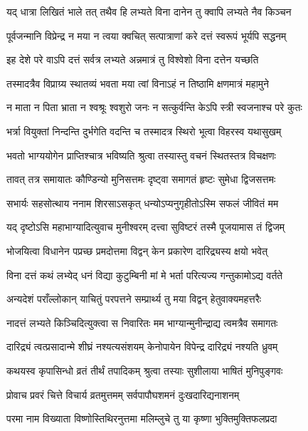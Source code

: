 \twolineshloka
{यद् धात्रा लिखितं भाले तत् तथैव हि लभ्यते}
{विना दानेन तु क्वापि लभ्यते नैव किञ्चन} %

\twolineshloka
{पूर्वजन्मानि विप्रेन्द्र न मया न त्वया क्वचित्}
{सत्पात्राणां करे दत्तं स्वरूपं भूर्यपि सद्धनम्} %

\twolineshloka
{इह देशे परे वाऽपि दत्तं सर्वत्र लभ्यते}
{अन्नमात्रं तु विश्वेशो विना दत्तेन यच्छति} %

\twolineshloka
{तस्मादत्रैव विप्राग्र्य स्थातव्यं भवता मया}
{त्वां विनाऽहं न तिष्ठामि क्षणमात्रं महामुने} %

\twolineshloka
{न माता न पिता भ्राता न श्वश्रूः श्वशुरो जनः}
{न सत्कुर्वन्ति केऽपि स्त्री स्वजनाश्च परे कुतः} %

\twolineshloka
{भर्त्रा वियुक्तां निन्दन्ति दुर्भगेति वदन्ति च}
{तस्मादत्र स्थिरो भूत्वा विहरस्व यथासुखम्} %

\twolineshloka
{भवतो भाग्ययोगेन प्राप्तिश्चात्र भविष्यति}
{श्रुत्वा तस्यास्तु वचनं स्थितस्तत्र विचक्षणः} %

\twolineshloka
{तावत् तत्र समायातः कौण्डिन्यो मुनिसत्तमः}
{दृष्ट्वा समागतं हृष्टः सुमेधा द्विजसत्तमः} %

\twolineshloka
{सभार्यः सहसोत्थाय ननाम शिरसाऽसकृत्}
{धन्योऽप्यनुगृहीतोऽस्मि सफलं जीवितं मम} %

\twolineshloka
{यद् दृष्टोऽसि महाभाग्यादित्युवाच मुनीश्वरम्}
{दत्त्वा सुविष्टरं तस्मै पूजयामास तं द्विजम्} %

\twolineshloka
{भोजयित्वा विधानेन पप्रच्छ प्रमदोत्तमा}
{विद्वन् केन प्रकारेण दारिद्र्यस्य क्षयो भवेत्} %

\twolineshloka
{विना दत्तं कथं लभ्येद् धनं विद्या कुटुम्बिनी}
{मां मे भर्ता परित्यज्य गन्तुकामोऽद्य वर्तते} %

\twolineshloka
{अन्यदेशं पराँल्लोकान् याचितुं परपत्तने}
{सम्प्रार्थ्य तु मया विद्वन् हेतुवाक्यमहत्तरैः} %

\twolineshloka
{नादत्तं लभ्यते किञ्चिदित्युक्त्वा स निवारितः}
{मम भाग्यान्मुनीन्द्राद्य त्वमत्रैव समागतः} %

\twolineshloka
{दारिद्र्यं त्वत्प्रसादान्मे शीघ्रं नश्यत्यसंशयम्}
{केनोपायेन विपेन्द्र दारिद्र्यं नश्यति ध्रुवम्} %

\twolineshloka
{कथयस्व कृपासिन्धो व्रतं तीर्थं तपादिकम्}
{श्रुत्वा तस्याः सुशीलाया भाषितं मुनिपुङ्गवः} %

\twolineshloka
{प्रोवाच प्रवरं चित्ते विचार्य व्रतमुत्तमम्}
{सर्वपापौघशमनं दुःखदारिद्यनाशनम्} %

\twolineshloka
{परमा नाम विख्याता विष्णोस्तिथिरनुत्तमा}
{मलिम्लुचे तु या कृष्णा भुक्तिमुक्तिफलप्रदा} %

